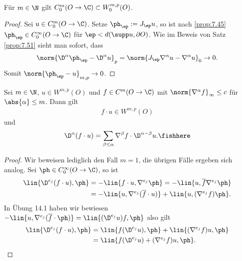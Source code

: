 \begin{cor}
\label{prop:7.52}
Für $m\in\N$ gilt $C_0^m(O\to\C)\subset W_0^{m,p}(O)$.\fishhere
\end{cor}
\begin{proof}
Sei $u\in C_0^m(O\to \C)$. Setze $\ph_\ep:=J_\ep u$, so ist nach
\ref{prop:7.45} $\ph_\ep\in C_0^\infty(O\to\C)$ für $\ep < d(\supp u,\partial
O)$. Wie im Beweis von Satz \ref{prop:7.51} sieht man sofort, dass
\begin{align*}
\norm{\D^\alpha \ph_\ep - \D^\alpha u}_p = \norm{J_\ep \nabla^\alpha u -
\nabla^\alpha u}_0 \to 0.
\end{align*}
Somit $\norm{\ph_\ep - u}_{m,p}\to 0$.\qedhere
\end{proof}

\begin{prop}[Produktregel]
Sei $m\in \N$, $u\in W^{m,p}(O)$ und $f\in C^m(O\to\C)$ mit
$\norm{\nabla^\alpha f}_\infty \le c$ für $\abs{\alpha}\le m$. Dann gilt
\begin{align*}
f\cdot u \in W^{m,p}(O)
\end{align*}
und
\begin{align*}
\D^\alpha (f\cdot u) = \sum_{\beta\le \alpha} \nabla^\beta f \cdot
\D^{\alpha-\beta} u.\fishhere
\end{align*}
\end{prop}
\begin{proof}
Wir beweisen lediglich den Fall $m=1$, die übrigen Fälle ergeben sich analog.
Sei $\ph\in C_0^\infty(O\to\C)$, so ist
\begin{align*}
\lin{\D^{e_j}(f\cdot u),\ph} &= - \lin{f\cdot u,\nabla^{e_j}\ph}
= -\lin{u,\overline{f}\nabla^{e_j}\ph}\\ & =
-\lin{u,\nabla^{e_j}(\overline{f}\cdot u)} + \lin{u,(\nabla^{e_j}f)\ph}.
\end{align*}
In Übung 14.1 haben wir bewiesen $-\lin{u,\nabla^{e_j} (\overline{f}\cdot\ph)}
= \lin{(\D^{e_j}u)f,\ph}$ also gilt
\begin{align*}
\lin{\D^{e_j}(f\cdot u),\ph}
&= \lin{f(\D^{e_j}u),\ph} + \lin{(\nabla^{e_j}f)u,\ph}\\
&=
\lin{f(\D^{e_j}u)+(\nabla^{e_j}f)u,\ph}.\qedhere
\end{align*} 
\end{proof}